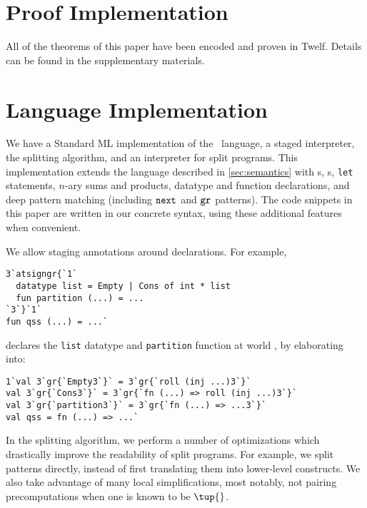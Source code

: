 
\section {Proof Implementation}

All of the theorems of this paper have been encoded and proven in Twelf.  Details can be found in the supplementary materials.

\section {Language Implementation}
\label{sec:implementation}

\begin{abstrsyn}
We have a Standard ML implementation of the \lang\ language, a staged
interpreter, the splitting algorithm, and an interpreter for split programs.
This implementation extends the language described in \ref{sec:semantics} with 
\rmint{}s,
\rmbool{}s,
\texttt{let} statements,
$n$-ary sums and products,
datatype and function declarations, and
deep pattern matching (including ${\tt next}{}$ and ${\tt gr}{}$ patterns).
The code snippets in this paper are written in our concrete syntax, using 
these additional features when convenient.

We allow staging annotations around declarations. For example,
\begin{lstlisting}
3`atsigngr{`1`
  datatype list = Empty | Cons of int * list
  fun partition (...) = ...
`3`}`1`
fun qss (...) = ...`
\end{lstlisting}
declares the \texttt{list} datatype and \texttt{partition} function at world \bbonep,
by elaborating into:
\begin{lstlisting}
1`val 3`gr{`Empty3`}` = 3`gr{`roll (inj ...)3`}`
val 3`gr{`Cons3`}` = 3`gr{`fn (...) => roll (inj ...)3`}`
val 3`gr{`partition3`}` = 3`gr{`fn (...) => ...3`}`
val qss = fn (...) => ...`
\end{lstlisting}

In the splitting algorithm, we perform a number of optimizations which
drastically improve the readability of split programs. For example, we split
patterns directly, instead of first translating them into lower-level
constructs. We also take advantage of many local simplifications, most notably,
not pairing precomputations when one is known to be $\tup{}$.




\end{abstrsyn}

